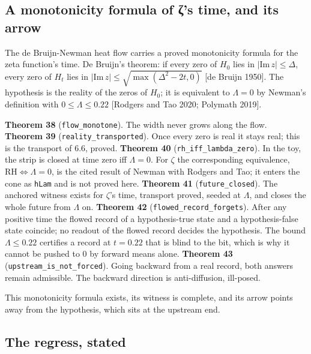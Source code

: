 \documentclass[10pt]{article}
\begin{document}
\hypertarget{a-monotonicity-formula-of-ux3b6s-time-and-its-arrow}{%
\subsection{A monotonicity formula of ζ's time, and its
arrow}\label{a-monotonicity-formula-of-ux3b6s-time-and-its-arrow}}

The de Bruijn-Newman heat flow carries a proved monotonicity formula for
the zeta function's time. De Bruijn's theorem: if every zero of \(H_0\)
lies in \(|\mathrm{Im}\, z| \leq \Delta\), every zero of \(H_t\) lies in
\(|\mathrm{Im}\, z| \leq \sqrt{\max(\Delta^2 - 2t, 0)}\) {[}de Bruijn
1950{]}. The hypothesis is the reality of the zeros of \(H_0\); it is
equivalent to \(\Lambda = 0\) by Newman's definition with
\(0 \leq \Lambda \leq 0.22\) {[}Rodgers and Tao 2020; Polymath 2019{]}.

\textbf{Theorem 38} (\texttt{flow\_monotone}). The width never grows
along the flow. \textbf{Theorem 39} (\texttt{reality\_transported}).
Once every zero is real it stays real; this is the transport of 6.6,
proved. \textbf{Theorem 40} (\texttt{rh\_iff\_lambda\_zero}). In the
toy, the strip is closed at time zero iff \(\Lambda = 0\). For \(\zeta\)
the corresponding equivalence, \(\mathrm{RH} \iff \Lambda = 0\), is the
cited result of Newman with Rodgers and Tao; it enters the cone as
\texttt{hLam} and is not proved here. \textbf{Theorem 41}
(\texttt{future\_closed}). The anchored witness exists for \(\zeta\)'s
time, transport proved, seeded at \(\Lambda\), and closes the whole
future from \(\Lambda\) on. \textbf{Theorem 42}
(\texttt{flowed\_record\_forgets}). After any positive time the flowed
record of a hypothesis-true state and a hypothesis-false state coincide;
no readout of the flowed record decides the hypothesis. The bound
\(\Lambda \leq 0.22\) certifies a record at \(t = 0.22\) that is blind
to the bit, which is why it cannot be pushed to \(0\) by forward means
alone. \textbf{Theorem 43} (\texttt{upstream\_is\_not\_forced}). Going
backward from a real record, both answers remain admissible. The
backward direction is anti-diffusion, ill-posed.

This monotonicity formula exists, its witness is complete, and its arrow
points away from the hypothesis, which sits at the upstream end.

\hypertarget{the-regress-stated}{%
\subsection{The regress, stated}\label{the-regress-stated}}
\end{document}
